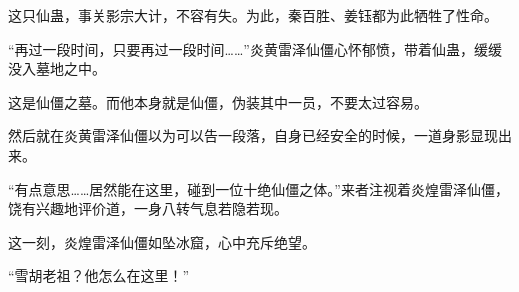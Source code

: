 \begin{this_body}
这只仙蛊，事关影宗大计，不容有失。为此，秦百胜、姜钰都为此牺牲了性命。

“再过一段时间，只要再过一段时间……”炎黄雷泽仙僵心怀郁愤，带着仙蛊，缓缓没入墓地之中。

这是仙僵之墓。而他本身就是仙僵，伪装其中一员，不要太过容易。

然后就在炎黄雷泽仙僵以为可以告一段落，自身已经安全的时候，一道身影显现出来。

“有点意思……居然能在这里，碰到一位十绝仙僵之体。”来者注视着炎煌雷泽仙僵，饶有兴趣地评价道，一身八转气息若隐若现。

这一刻，炎煌雷泽仙僵如坠冰窟，心中充斥绝望。

“雪胡老祖？他怎么在这里！”

\end{this_body}

